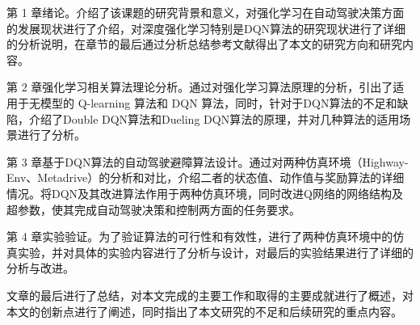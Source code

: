 第 1 章绪论。介绍了该课题的研究背景和意义，对强化学习在自动驾驶决策方面的发展现状进行了介绍，对深度强化学习特别是DQN算法的研究现状进行了详细的分析说明，在章节的最后通过分析总结参考文献得出了本文的研究方向和研究内容。

第 2 章强化学习相关算法理论分析。通过对强化学习算法原理的分析，引出了适用于无模型的 Q-learning 算法和 DQN 算法，同时，针对于DQN算法的不足和缺陷，介绍了Double DQN算法和Dueling DQN算法的原理，并对几种算法的适用场景进行了分析。

第 3 章基于DQN算法的自动驾驶避障算法设计。通过对两种仿真环境（Highway-Env、Metadrive）的分析和对比，介绍二者的状态值、动作值与奖励算法的详细情况。将DQN及其改进算法作用于两种仿真环境，同时改进Q网络的网络结构及超参数，使其完成自动驾驶决策和控制两方面的任务要求。

第 4 章实验验证。为了验证算法的可行性和有效性，进行了两种仿真环境中的仿真实验，并对具体的实验内容进行了分析与设计，对最后的实验结果进行了详细的分析与改进。

文章的最后进行了总结，对本文完成的主要工作和取得的主要成就进行了概述，对本文的创新点进行了阐述，同时指出了本文研究的不足和后续研究的重点内容。


